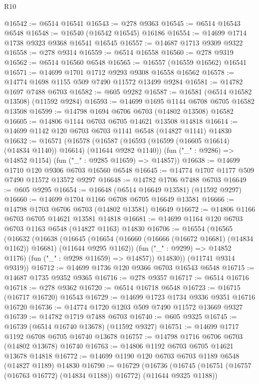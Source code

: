 \begin{lexlean}{R10}
\begin{coremodule}
{{{{{{{{{{{{{{{{{{{{{{{{{{{{{{{{{{{{{{{{{{{{{{{{{{{{{{{{{{{{{{{{{{{{{{{{{{{{{{{{{{{{@16542 := @6514 @16541
@16543 := @278 @9363
@16545 := @6514 @16543 @6548
@16548 := @16540 (@16542 @16545) @16186
@16554 := @14699 @1714 @1738 @9323 @9368 @16541 @16545
@16557 := @14687 @1713 @9309 @9322
@16558 := @278 @9314
@16559 := @6514 @16558
@16560 := @278 @9319
@16562 := @6514 @16560 @6548
@16565 := @16557 (@16559 @16562) @16541
@16571 := @14699 @1701 @1712 @9293 @9308 @16558 @16562
@16578 := @14774 @1698 @1155 @509 @7490 @11572 @13499 @9284
@16581 := @14782 @1697 @7488 @6703
@16582 := @605 @9282
@16587 := @16581 (@6514 @16582 @13508) (@11592 @9284)
@16593 := @14699 @1695 @1144 @6708 @6705 @16582 @13508
@16599 := @14798 @1694 @6706 @6703 (@14802 @13508) @16582
@16605 := @14806 @1144 @6703 @6705 @14621 @13508 @14818
@16614 := @14699 @1142 @120 @6703 @6703 @1141 @6548 (@14827 @1141) @14830
@16632 := @16571
    (@16578
      (@16587 (@16593 (@16599 (@16605 @16614) (@14834 @1140)) @16614) (@11644 @9282 @1140))
      (fun ("_" : @9286) => @14852 @1154)
      (fun ("_" : @9285 @11659) => @14857))
@16638 := @14699 @1710 @120 @9306 @6703 @16560 @6548
@16645 := @14774 @1707 @1177 @509 @7490 @11572 @13572 @9297
@16648 := @14782 @1706 @7488 @6703
@16649 := @605 @9295
@16654 := @16648 (@6514 @16649 @13581) (@11592 @9297)
@16660 := @14699 @1704 @1166 @6708 @6705 @16649 @13581
@16666 := @14798 @1703 @6706 @6703 (@14802 @13581) @16649
@16672 := @14806 @1166 @6703 @6705 @14621 @13581 @14818
@16681 := @14699 @1164 @120 @6703 @6703 @1163 @6548 (@14827 @1163) @14830
@16706 := @16554
    (@16565
      (@16632
        (@16638
          (@16645
            (@16654 (@16660 (@16666 (@16672 @16681) (@14834 @1162)) @16681) (@11644 @9295 @1162))
            (fun ("_" : @9299) => @14852 @1176)
            (fun ("_" : @9298 @11659) => @14857))
          @14830))
      (@11741 @9314 @9319))
@16712 := @14699 @1736 @120 @9366 @6703 @16543 @6548
@16715 := @14687 @1735 @9352 @9365
@16716 := @278 @9357
@16717 := @6514 @16716
@16718 := @278 @9362
@16720 := @6514 @16718 @6548
@16723 := @16715 (@16717 @16720) @16543
@16729 := @14699 @1723 @1734 @9336 @9351 @16716 @16720
@16736 := @14774 @1720 @1203 @509 @7490 @11572 @13669 @9327
@16739 := @14782 @1719 @7488 @6703
@16740 := @605 @9325
@16745 := @16739 (@6514 @16740 @13678) (@11592 @9327)
@16751 := @14699 @1717 @1192 @6708 @6705 @16740 @13678
@16757 := @14798 @1716 @6706 @6703 (@14802 @13678) @16740
@16763 := @14806 @1192 @6703 @6705 @14621 @13678 @14818
@16772 := @14699 @1190 @120 @6703 @6703 @1189 @6548 (@14827 @1189) @14830
@16790 := @16729
    (@16736
      (@16745 (@16751 (@16757 (@16763 @16772) (@14834 @1188)) @16772) (@11644 @9325 @1188))
}}}}}}}}}}}}}}}}}}}}}}}}}}}}}}}}}}}}}}}}}}}}}}}}}}}}}}}}}}}}}}}}}}}}}}}}}}}}}}}}}}}}
\end{coremodule}
\end{lexlean}
